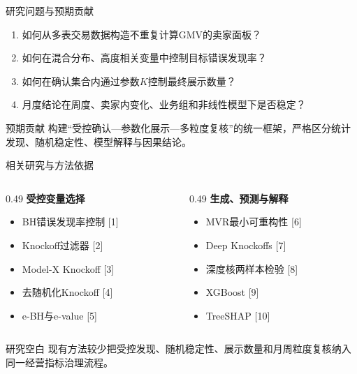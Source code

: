 \documentclass[aspectratio=169]{beamer}
\begin{document}
\begin{frame}{研究问题与预期贡献}
  \begin{enumerate}
    \item 如何从多表交易数据构造不重复计算GMV的卖家面板？
    \item 如何在混合分布、高度相关变量中控制目标错误发现率？
    \item 如何在确认集合内通过参数$K$控制最终展示数量？
    \item 月度结论在周度、卖家内变化、业务组和非线性模型下是否稳定？
  \end{enumerate}
  \vspace{0.3cm}
  \begin{block}{预期贡献}
    构建“受控确认—参数化展示—多粒度复核”的统一框架，严格区分统计发现、随机稳定性、模型解释与因果结论。
  \end{block}
\end{frame}

\begin{frame}{相关研究与方法依据}
  \begin{columns}[T]
    \begin{column}{0.49\textwidth}
      \textbf{受控变量选择}
      \begin{itemize}
        \item BH错误发现率控制 [1]
        \item Knockoff过滤器 [2]
        \item Model-X Knockoff [3]
        \item 去随机化Knockoff [4]
        \item e-BH与e-value [5]
      \end{itemize}
    \end{column}
    \begin{column}{0.49\textwidth}
      \textbf{生成、预测与解释}
      \begin{itemize}
        \item MVR最小可重构性 [6]
        \item Deep Knockoffs [7]
        \item 深度核两样本检验 [8]
        \item XGBoost [9]
        \item TreeSHAP [10]
      \end{itemize}
    \end{column}
  \end{columns}
  \begin{alertblock}{研究空白}
    现有方法较少把受控发现、随机稳定性、展示数量和月周粒度复核纳入同一经营指标治理流程。
  \end{alertblock}
\end{frame}
\end{document}
